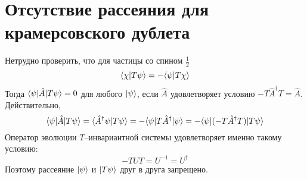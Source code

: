 \section{Отсутствие рассеяния для крамерсовского дублета}
\label{app:kramers_doublet}
Нетрудно проверить, что для частицы со спином $\frac{1}{2}$
\begin{equation}
    \langle \chi | T\psi \rangle = -\langle \psi | T\chi\rangle
\end{equation}
Тогда $\langle \psi | \hat{A}  | T\psi \rangle = 0$ для любого 
$|\psi \rangle$, если
$\hat{A}$ удовлетворяет условию $-T\hat{A}^\dagger T = \hat{A}$.
Действительно,
\begin{equation}
    \langle \psi | \hat{A}  | T\psi \rangle = \langle \hat{A}^\dagger \psi | T\psi \rangle = 
       -\langle \psi | T \hat{A}^\dagger| \psi \rangle = -\langle \psi | (-T\hat{A}^\dagger T) | T\psi \rangle
\end{equation}
Оператор эволюции $T$--инвариантной системы удовлетворяет именно такому условию:
\begin{equation}
    -T\hat{U}T = U^{-1} = U^\dagger
\end{equation}
Поэтому рассеяние $|\psi\rangle$ и $|T\psi\rangle$ друг в друга запрещено.
